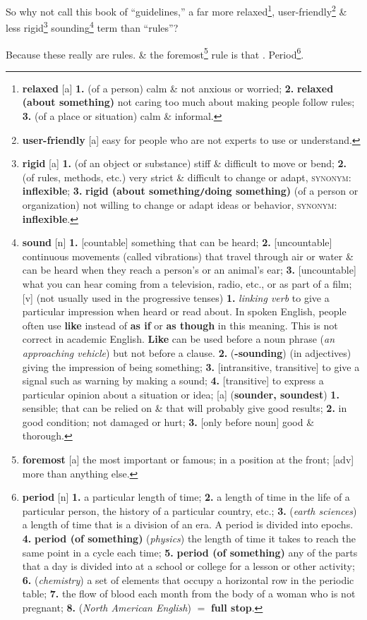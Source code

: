 \documentclass[oneside]{book}
\numberwithin{equation}{section}
\begin{document}
So why not call this book of ``guidelines,'' a far more relaxed\footnote{\textbf{relaxed} [a] \textbf{1.} (of a person) calm \& not anxious or worried; \textbf{2.} \textbf{relaxed (about something)} not caring too much about making people follow rules; \textbf{3.} (of a place or situation) calm \& informal.}, user-friendly\footnote{\textbf{user-friendly} [a] easy for people who are not experts to use or understand.} \& less rigid\footnote{\textbf{rigid} [a] \textbf{1.} (of an object or substance) stiff \& difficult to move or bend; \textbf{2.} (of rules, methods, etc.) very strict \& difficult to change or adapt, \textsc{synonym}: \textbf{inflexible}; \textbf{3.} \textbf{rigid (about something\texttt{/}doing something)} (of a person or organization) not willing to change or adapt ideas or behavior, \textsc{synonym}: \textbf{inflexible}.} sounding\footnote{\textbf{sound} [n] \textbf{1.} [countable] something that can be heard; \textbf{2.} [uncountable] continuous movements (called vibrations) that travel through air or water \& can be heard when they reach a person's or an animal's ear; \textbf{3.} [uncountable] what you can hear coming from a television, radio, etc., or as part of a film; [v] (not usually used in the progressive tenses) \textbf{1.} \textit{linking verb} to give a particular impression when heard or read about. In spoken English, people often use \textbf{like} instead of \textbf{as if} or \textbf{as though} in this meaning. This is not correct in academic English. \textbf{Like} can be used before a noun phrase (\textit{an approaching vehicle}) but not before a clause. \textbf{2.} (\textbf{-sounding}) (in adjectives) giving the impression of being something; \textbf{3.} [intransitive, transitive] to give a signal such as warning by making a sound; \textbf{4.} [transitive] to express a particular opinion about a situation or idea; [a] (\textbf{sounder, soundest}) \textbf{1.} sensible; that can be relied on \& that will probably give good results; \textbf{2.} in good condition; not damaged or hurt; \textbf{3.} [only before noun] good \& thorough.} term than ``rules''?

Because these really are rules. \& the foremost\footnote{\textbf{foremost} [a] the most important or famous; in a position at the front; [adv] more than anything else.} rule is that . Period\footnote{\textbf{period} [n] \textbf{1.} a particular length of time; \textbf{2.} a length of time in the life of a particular person, the history of a particular country, etc.; \textbf{3.} (\textit{earth sciences}) a length of time that is a division of an era. A period is divided into epochs. \textbf{4.} \textbf{period (of something)} (\textit{physics}) the length of time it takes to reach the same point in a cycle each time; \textbf{5.} \textbf{period (of something)} any of the parts that a day is divided into at a school or college for a lesson or other activity; \textbf{6.} (\textit{chemistry}) a set of elements that occupy a horizontal row in the periodic table; \textbf{7.} the flow of blood each month from the body of a woman who is not pregnant; \textbf{8.} (\textit{North American English}) $=$ \textbf{full stop}.}.
\end{document}
